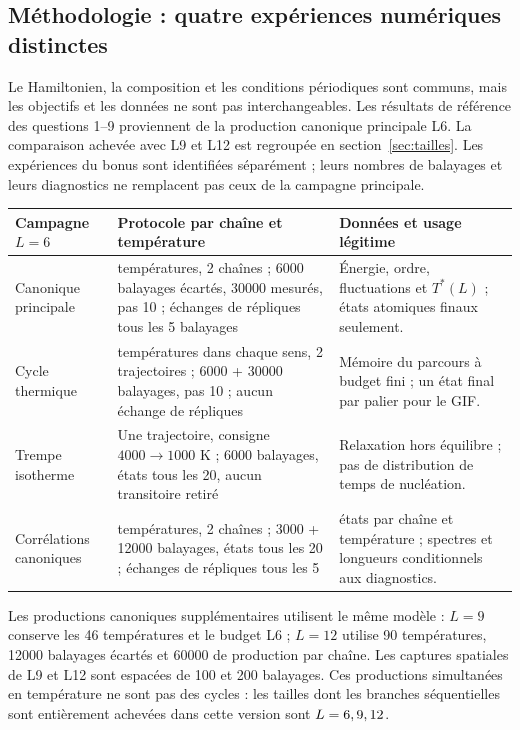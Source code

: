 \documentclass[10pt,a4paper]{article}
\begin{document}
\subsection*{Méthodologie : quatre expériences numériques distinctes}
Le Hamiltonien, la composition et les conditions périodiques sont communs,
mais les objectifs et les données ne sont pas interchangeables.
Les résultats de référence des questions 1--9 proviennent de la production
canonique principale L6. La comparaison achevée avec L9 et L12 est regroupée en
section~\ref{sec:tailles}.
Les expériences du bonus sont identifiées séparément ; leurs nombres de
balayages et leurs diagnostics ne remplacent pas ceux de la campagne principale.
\begin{center}\small
\begin{tabular}{>{\raggedright\arraybackslash}p{.23\linewidth}>{\raggedright\arraybackslash}p{.31\linewidth}>{\raggedright\arraybackslash}p{.35\linewidth}}
\toprule
Campagne $L=6$ & Protocole par chaîne et température & Données et usage légitime\\\midrule
Canonique principale & 46 températures, 2 chaînes ; 6000 balayages écartés,
30000 mesurés, pas 10 ; échanges de répliques tous les 5 balayages &
Énergie, ordre, fluctuations et $T^*(L)$ ; états atomiques finaux seulement.\\
Cycle thermique & 46 températures dans chaque sens, 2 trajectoires ;
6000 + 30000 balayages, pas 10 ; aucun échange de répliques &
Mémoire du parcours à budget fini ; un état final par palier pour le GIF.\\
Trempe isotherme & Une trajectoire, consigne $4000\to1000$ K ;
6000 balayages, états tous les 20, aucun transitoire retiré &
Relaxation hors équilibre ; pas de distribution de temps de nucléation.\\
Corrélations canoniques & 14 températures, 2 chaînes ; 3000 + 12000 balayages,
états tous les 20 ; échanges de répliques tous les 5 &
600 états par chaîne et température ; spectres et longueurs conditionnels aux diagnostics.\\
\bottomrule
\end{tabular}\end{center}
Les productions canoniques supplémentaires utilisent le même modèle :
$L=9$ conserve les 46 températures et le budget L6 ; $L=12$ utilise
90 températures, 12000 balayages écartés et 60000 de production par chaîne.
Les captures spatiales de L9 et L12 sont espacées de 100 et 200 balayages.
Ces productions simultanées en température ne sont pas des cycles :
les tailles dont les branches séquentielles sont entièrement achevées
dans cette version sont $L=6, 9, 12$.
\end{document}
